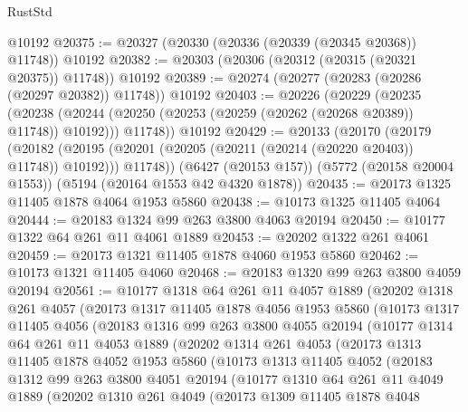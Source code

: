 \begin{lexlean}{RustStd}
\begin{coremodule}
{\begin{coremodule}
{{{{{{{{{{{{{{{{{{{{{{{{{{{{{    @10192
@20375 := @20327 (@20330 (@20336 (@20339 (@20345 @20368)) @11748)) @10192
@20382 := @20303 (@20306 (@20312 (@20315 (@20321 @20375)) @11748)) @10192
@20389 := @20274 (@20277 (@20283 (@20286 (@20297 @20382)) @11748)) @10192
@20403 := @20226
    (@20229
      (@20235
        (@20238 (@20244 (@20250 (@20253 (@20259 (@20262 (@20268 @20389)) @11748)) @10192)))
        @11748))
    @10192
@20429 := @20133
    (@20170
      (@20179
        (@20182 (@20195 (@20201 (@20205 (@20211 (@20214 (@20220 @20403)) @11748)) @10192)))
        @11748))
    (@6427 (@20153 @157))
    (@5772 (@20158 @20004 @1553))
    (@5194 (@20164 @1553 @42 @4320 @1878))
@20435 := @20173 @1325 @11405 @1878 @4064 @1953 @5860
@20438 := @10173 @1325 @11405 @4064
@20444 := @20183 @1324 @99 @263 @3800 @4063 @20194
@20450 := @10177 @1322 @64 @261 @11 @4061 @1889
@20453 := @20202 @1322 @261 @4061
@20459 := @20173 @1321 @11405 @1878 @4060 @1953 @5860
@20462 := @10173 @1321 @11405 @4060
@20468 := @20183 @1320 @99 @263 @3800 @4059 @20194
@20561 := @10177
    @1318
    @64
    @261
    @11
    @4057
    @1889
    (@20202
      @1318
      @261
      @4057
      (@20173
        @1317
        @11405
        @1878
        @4056
        @1953
        @5860
        (@10173
          @1317
          @11405
          @4056
          (@20183
            @1316
            @99
            @263
            @3800
            @4055
            @20194
            (@10177
              @1314
              @64
              @261
              @11
              @4053
              @1889
              (@20202
                @1314
                @261
                @4053
                (@20173
                  @1313
                  @11405
                  @1878
                  @4052
                  @1953
                  @5860
                  (@10173
                    @1313
                    @11405
                    @4052
                    (@20183
                      @1312
                      @99
                      @263
                      @3800
                      @4051
                      @20194
                      (@10177
                        @1310
                        @64
                        @261
                        @11
                        @4049
                        @1889
                        (@20202
                          @1310
                          @261
                          @4049
                          (@20173
                            @1309
                            @11405
                            @1878
                            @4048
}}}}}}}}}}}}}}}}}}}}}}}}}}}}}
\end{coremodule}}
\end{coremodule}
\end{lexlean}
